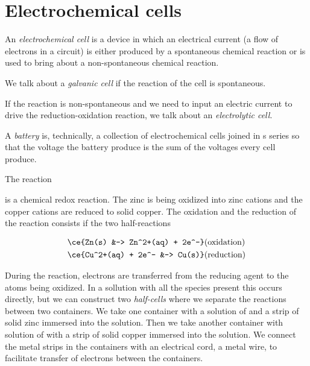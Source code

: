\documentclass[../mit-general-chemistry.tex]{subfiles}
\begin{document}
\section{Electrochemical cells}


\begin{definition}
  An {\em electrochemical cell} is a device in which an electrical
  current (a flow of electrons in a circuit) is either produced by a
  spontaneous chemical reaction or is used to bring about a
  non-spontaneous chemical reaction.

  We talk about a {\em galvanic cell} if the reaction of the cell is
  spontaneous.

  If the reaction is non-spontaneous and we need to input an electric
  current to drive the reduction-oxidation reaction, we talk about an
  {\em electrolytic cell}.
\end{definition}

\begin{definition}
  A {\em battery} is, technically, a collection of electrochemical
  cells joined in s series so that the voltage the battery produce is
  the sum of the voltages every cell produce.
\end{definition}



The reaction


is a chemical redox reaction. The zinc is being oxidized into zinc
cations and the copper cations are reduced to solid copper. The
oxidation and the reduction of the reaction consists if the two
half-reactions

\begin{align}
  \ce{Zn(s) &-> Zn^2+(aq) + 2e^-} &\text{(oxidation)}\\
  \ce{Cu^2+(aq) + 2e^- &-> Cu(s)} &\text{(reduction)}
\end{align}


During the reaction, electrons are transferred from the reducing agent
to the atoms being oxidized. In a sollution with all the species
present this occurs directly, but we can construct two {\em
  half-cells} where we separate the reactions between two
containers. We take one container with a solution of  and a
strip of solid zinc immersed into the solution. Then we take another
container with solution of  with a strip of solid copper
immersed into the solution. We connect the metal strips in the
containers with an electrical cord, a metal wire, to facilitate
transfer of electrons between the containers.
\end{document}
